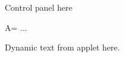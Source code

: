 \documentclass{ximera}
\begin{document}
\begin{problem}

\begin{validator}
Control panel here

A= ...


Dynamic text from applet here.
\end{validator}


\end{problem}
\end{document}
